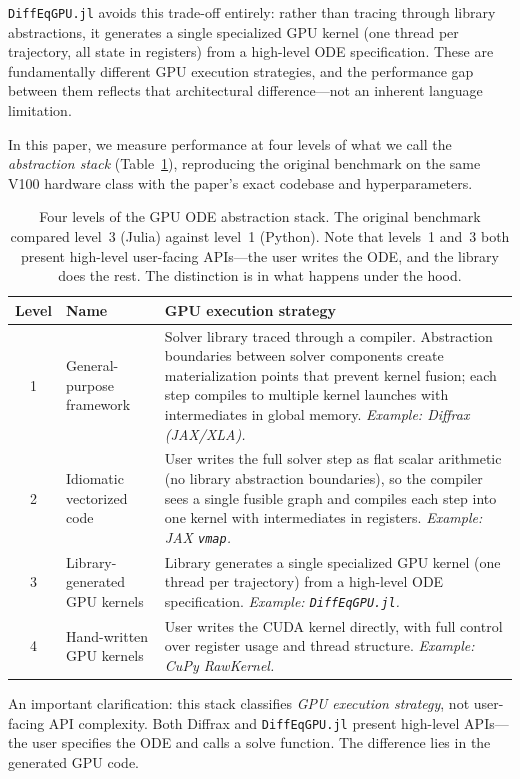 \documentclass[11pt]{article}
\begin{document}
\texttt{DiffEqGPU.jl} avoids this trade-off entirely: rather than
tracing through library abstractions, it generates a single
specialized GPU kernel (one thread per trajectory, all state in
registers) from a high-level ODE specification.
These are fundamentally different GPU execution strategies, and the
performance gap between them reflects that architectural
difference---not an inherent language limitation.

In this paper, we measure performance at four levels of what we
call the \emph{abstraction stack} (Table~\ref{tab:stack}),
reproducing the original benchmark on the same V100 hardware class
with the paper's exact codebase and hyperparameters.

\begin{table}[t]
\centering
\small
\begin{tabular}{@{}clp{6.2cm}@{}}
\toprule
Level & Name & GPU execution strategy \\
\midrule
1 & General-purpose framework &
Solver library traced through a compiler.
Abstraction boundaries between solver components create
materialization points that prevent kernel fusion;
each step compiles to multiple kernel launches with
intermediates in global memory.
\emph{Example: Diffrax (JAX/XLA).} \\[4pt]
2 & Idiomatic vectorized code &
User writes the full solver step as flat scalar arithmetic
(no library abstraction boundaries), so the compiler sees a
single fusible graph and compiles each step into one kernel
with intermediates in registers.
\emph{Example: JAX \texttt{vmap}.} \\[4pt]
3 & Library-generated GPU kernels &
Library generates a single specialized GPU kernel (one thread
per trajectory) from a high-level ODE specification.
\emph{Example: \texttt{DiffEqGPU.jl}.} \\[4pt]
4 & Hand-written GPU kernels &
User writes the CUDA kernel directly, with full control over
register usage and thread structure.
\emph{Example: CuPy RawKernel.} \\
\bottomrule
\end{tabular}
\caption{Four levels of the GPU ODE abstraction stack.
The original benchmark compared level~3 (Julia) against level~1
(Python).
Note that levels~1 and~3 both present high-level user-facing
APIs---the user writes the ODE, and the library does the rest.
The distinction is in what happens under the hood.}
\label{tab:stack}
\end{table}

An important clarification: this stack classifies \emph{GPU
execution strategy}, not user-facing API complexity.
Both Diffrax and \texttt{DiffEqGPU.jl} present high-level
APIs---the user specifies the ODE and calls a solve function.
The difference lies in the generated GPU code.
\end{document}

